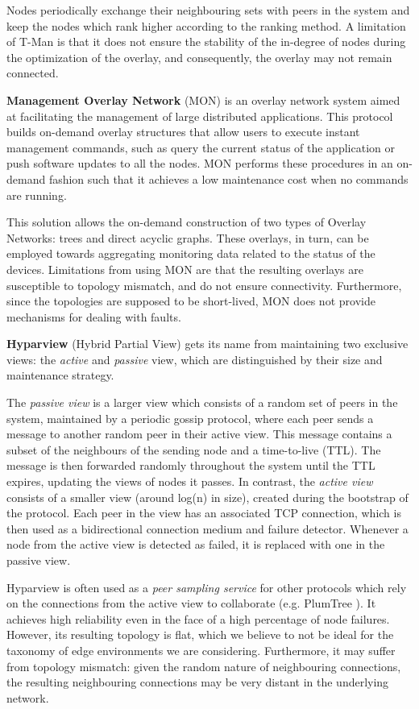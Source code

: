 Nodes periodically exchange their neighbouring sets with peers in the system and keep the nodes which rank higher according to the ranking method. A limitation of T-Man is that it does not ensure the stability of the in-degree of nodes during the optimization of the overlay, and consequently, the overlay may not remain connected. 

\textbf{Management Overlay Network} \cite{liang2005mon} (MON) is an overlay network system aimed at facilitating the management of large distributed applications. This protocol builds on-demand overlay structures that allow users to execute instant management commands, such as query the current status of the application or push software updates to all the nodes. MON performs these procedures in an on-demand fashion such that it achieves a low maintenance cost when no commands are running.

This solution allows the on-demand construction of two types of Overlay Networks: trees and direct acyclic graphs. These overlays, in turn, can be employed towards aggregating monitoring data related to the status of the devices. Limitations from using MON are that the resulting overlays are susceptible to topology mismatch, and do not ensure connectivity. Furthermore, since the topologies are supposed to be short-lived, MON does not provide mechanisms for dealing with faults.

\textbf{Hyparview} \cite{Hyparview} (Hybrid Partial View) gets its name from maintaining two exclusive views: the \textit{active} and \textit{passive} view, which are distinguished by their size and maintenance strategy. 

The \textit{passive view} is a larger view which consists of a random set of peers in the system,  maintained by a periodic gossip protocol, where each peer sends a message to another random peer in their active view. This message contains a subset of the neighbours of the sending node and a time-to-live (TTL). The message is then forwarded randomly throughout the system until the TTL expires, updating the views of nodes it passes. In contrast, the \textit{active view} consists of a smaller view (around log(n) in size), created during the bootstrap of the protocol. Each peer in the view has an associated TCP connection, which is then used as a bidirectional connection medium and failure detector. Whenever a node from the active view is detected as failed, it is replaced with one in the passive view.

Hyparview is often used as a \textit{peer sampling service} for other protocols which rely on the connections from the active view to collaborate (e.g. PlumTree \cite{plumTree}). It achieves high reliability even in the face of a high percentage of node failures. However, its resulting topology is flat, which we believe to not be ideal for the taxonomy of edge environments we are considering. Furthermore, it may suffer from topology mismatch: given the random nature of neighbouring connections, the resulting neighbouring connections may be very distant in the underlying network.

